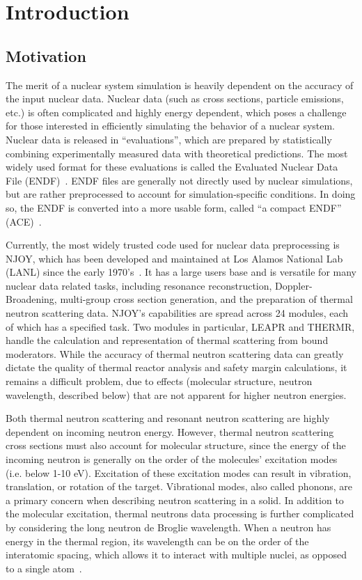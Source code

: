 \documentclass[../master.tex]{subfiles}
\begin{document}
\chapter{Introduction}

	\section{Motivation}\label{sec:motivation}
		The merit of a nuclear system simulation is heavily dependent on the accuracy of the input nuclear data. Nuclear data (such as cross sections, particle emissions, etc.) is often complicated and highly energy dependent, which poses a challenge for those interested in efficiently simulating the behavior of a nuclear system. Nuclear data is released in ``evaluations'', which are prepared by statistically combining experimentally measured data with theoretical predictions. The most widely used format for these evaluations is called the Evaluated Nuclear Data File (ENDF)~\cite{endfManual}. ENDF files are generally not directly used by nuclear simulations, but are rather preprocessed to account for simulation-specific conditions. In doing so, the ENDF is converted into a more usable form, called ``a compact ENDF'' (ACE)~\cite{ace}.\par
		
		Currently, the most widely trusted code used for nuclear data preprocessing is NJOY, which has been developed and maintained at Los Alamos National Lab (LANL) since the early 1970's~\cite{njoy}. It has a large users base and is versatile for many nuclear data related tasks, including resonance reconstruction, Doppler-Broadening, multi-group cross section generation, and the preparation of thermal neutron scattering data. NJOY's capabilities are spread across 24 modules, each of which has a specified task. Two modules in particular, LEAPR and THERMR, handle the calculation and representation of thermal scattering from bound moderators. While the accuracy of thermal neutron scattering data can greatly dictate the quality of thermal reactor analysis and safety margin calculations, it remains a difficult problem, due to effects (molecular structure, neutron wavelength, described below) that are not apparent for higher neutron energies. \par

		Both thermal neutron scattering and resonant neutron scattering are highly dependent on incoming neutron energy. However, thermal neutron scattering cross sections must also account for molecular structure, since the energy of the incoming neutron is generally on the order of the molecules' excitation modes (i.e. below 1-10 eV). Excitation of these excitation modes can result in vibration, translation, or rotation of the target. Vibrational modes, also called phonons, are a primary concern when describing neutron scattering in a solid. In addition to the molecular excitation, thermal neutrons data processing is further complicated by considering the long neutron de Broglie wavelength. When a neutron has energy in the thermal region, its wavelength can be on the order of the interatomic spacing, which allows it to interact with multiple nuclei, as opposed to a single atom~\cite{jesseholmes}. 
\end{document}
